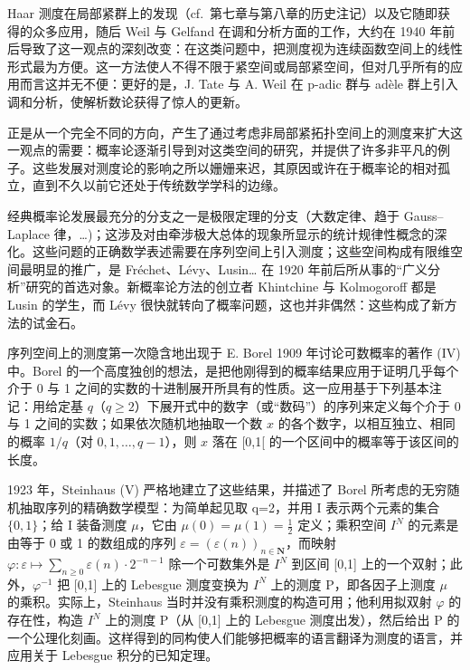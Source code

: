 Haar 测度在局部紧群上的发现（cf.~第七章与第八章的历史注记）以及它随即获得的众多应用，随后 Weil 与 Gelfand 在调和分析方面的工作，大约在 1940 年前后导致了这一观点的深刻改变：在这类问题中，把测度视为连续函数空间上的线性形式最为方便。这一方法使人不得不限于紧空间或局部紧空间，但对几乎所有的应用而言这并无不便：更好的是，J. Tate 与 A. Weil 在 p-adic 群与 adèle 群上引入调和分析，使解析数论获得了惊人的更新。

正是从一个完全不同的方向，产生了通过考虑非局部紧拓扑空间上的测度来扩大这一观点的需要：概率论逐渐引导到对这类空间的研究，并提供了许多非平凡的例子。这些发展对测度论的影响之所以姗姗来迟，其原因或许在于概率论的相对孤立，直到不久以前它还处于传统数学学科的边缘。


经典概率论发展最充分的分支之一是极限定理的分支（大数定律、趋于 Gauss--Laplace 律，\ldots)；这涉及对由牵涉极大总体的现象所显示的统计规律性概念的深化。这些问题的正确数学表述需要在序列空间上引入测度；这些空间构成有限维空间最明显的推广，是 Fréchet、Lévy、Lusin\ldots{} 在 1920 年前后所从事的“广义分析”研究的首选对象。新概率论方法的创立者 Khintchine 与 Kolmogoroff 都是 Lusin 的学生，而 Lévy 很快就转向了概率问题，这也并非偶然：这些构成了新方法的试金石。

序列空间上的测度第一次隐含地出现于 E. Borel 1909 年讨论可数概率的著作 (IV) 中。Borel 的一个高度独创的想法，是把他刚得到的概率结果应用于证明几乎每个介于 0 与 1 之间的实数的十进制展开所具有的性质。这一应用基于下列基本注记：用给定基 \(q\)（\(q \geqslant 2\)）下展开式中的数字（或“数码”）的序列来定义每个介于 0 与 1 之间的实数；如果依次随机地抽取一个数 \(x\) 的各个数字，以相互独立、相同的概率 \(1 / q\)（对 \(0,1,\ldots ,q - 1\)），则 \(x\) 落在 {[}0,1{[} 的一个区间中的概率等于该区间的长度。

1923 年，Steinhaus (V) 严格地建立了这些结果，并描述了 Borel 所考虑的无穷随机抽取序列的精确数学模型：为简单起见取 q=2，并用 I 表示两个元素的集合 \(\{0,1\}\)；给 I 装备测度 \(\mu\)，它由 \(\mu(0)=\mu(1)=\frac{1}{2}\) 定义；乘积空间 \(I^{N}\) 的元素是由等于 0 或 1 的数组成的序列 \(\varepsilon=(\varepsilon(n))_{n\in\mathbf{N}}\)，而映射 \(\varphi:\varepsilon\mapsto\sum_{n\geqslant0}\varepsilon(n)\cdot2^{-n-1}\) 除一个可数集外是 \(I^{N}\) 到区间 {[}0,1{]} 上的一个双射；此外，\(\varphi^{-1}\) 把 {[}0,1{]} 上的 Lebesgue 测度变换为 \(I^{N}\) 上的测度 P，即各因子上测度 \(\mu\) 的乘积。实际上，Steinhaus 当时并没有乘积测度的构造可用；他利用拟双射 \(\varphi\) 的存在性，构造 \(I^{N}\) 上的测度 P（从 {[}0,1{]} 上的 Lebesgue 测度出发），然后给出 P 的一个公理化刻画。这样得到的同构使人们能够把概率的语言翻译为测度的语言，并应用关于 Lebesgue 积分的已知定理。

